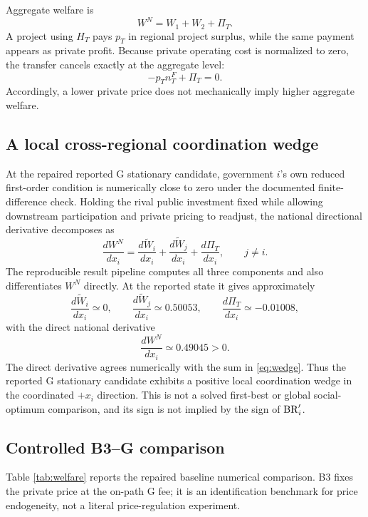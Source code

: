 Aggregate welfare is
\begin{equation}
W^N=W_1+W_2+\Pi_T.
\label{eq:WN}
\end{equation}
A project using $H_T$ pays $p_T$ in regional project surplus, while the same payment appears as private profit. Because private operating cost is normalized to zero, the transfer cancels exactly at the aggregate level:
\[
-p_Tn_T^F+\Pi_T=0.
\]
Accordingly, a lower private price does not mechanically imply higher aggregate welfare.

\subsection{A local cross-regional coordination wedge}

At the repaired reported G stationary candidate, government $i$'s own reduced first-order condition is numerically close to zero under the documented finite-difference check. Holding the rival public investment fixed while allowing downstream participation and private pricing to readjust, the national directional derivative decomposes as
\begin{equation}
\frac{dW^N}{dx_i}
=
\frac{d\widetilde W_i}{dx_i}
+
\frac{d\widetilde W_j}{dx_i}
+
\frac{d\Pi_T}{dx_i},
\qquad j\neq i.
\label{eq:wedge}
\end{equation}
The reproducible result pipeline computes all three components and also differentiates $W^N$ directly. At the reported state it gives approximately
\[
\frac{d\widetilde W_i}{dx_i}\simeq0,
\qquad
\frac{d\widetilde W_j}{dx_i}\simeq0.50053,
\qquad
\frac{d\Pi_T}{dx_i}\simeq-0.01008,
\]
with the direct national derivative
\[
\frac{dW^N}{dx_i}\simeq0.49045>0.
\]
The direct derivative agrees numerically with the sum in \eqref{eq:wedge}. Thus the reported G stationary candidate exhibits a positive local coordination wedge in the coordinated $+x_i$ direction. This is not a solved first-best or global social-optimum comparison, and its sign is not implied by the sign of $\mathrm{BR}_i'$.

\subsection{Controlled B3--G comparison}

Table \ref{tab:welfare} reports the repaired baseline numerical comparison. B3 fixes the private price at the on-path G fee; it is an identification benchmark for price endogeneity, not a literal price-regulation experiment.

